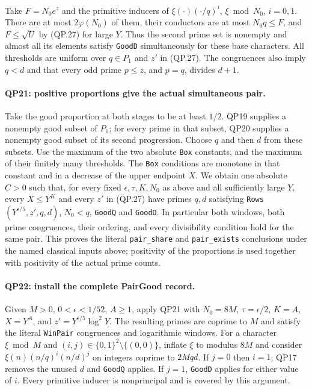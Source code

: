 Take $F=N_0e^z$ and the primitive inducers of
$\xi(\cdot)(\cdot/q)^i$, $\xi\bmod N_0$, $i=0,1$.
There are at most $2\varphi(N_0)$ of them, their conductors are at most
$N_0q\le F$, and $F\le\sqrt U$ by (QP.27) for large $Y$.
Thus the second prime set is nonempty and almost all its elements
satisfy \texttt{GoodD} simultaneously for these base characters.
All thresholds are uniform over $q\in P_1$ and $z'$ in (QP.27).
The congruences also imply $q<d$ and that every odd prime $p\le z$,
and $p=q$, divides $d+1$.

\paragraph{QP21: positive proportions give the actual simultaneous pair.}
Take the good proportion at both stages to be at least $1/2$.
QP19 supplies a nonempty good subset of $P_1$; for every prime in that
subset, QP20 supplies a nonempty good subset of its second progression.
Choose $q$ and then $d$ from these subsets.  Use the maximum of the two
absolute \texttt{Box} constants, and the maximum of their finitely many
thresholds.  The \texttt{Box} conditions are monotone in that constant
and in a decrease of the upper endpoint $X$.
We obtain one absolute $C>0$ such that, for every fixed
$\epsilon,\tau,K,N_0$ as above and all sufficiently large $Y$, every
$X\le Y^K$ and every $z'$ in (QP.27) have primes $q,d$ satisfying
\texttt{Rows}$(Y^{\epsilon/5},z',q,d)$, $N_0<q$,
\texttt{GoodQ} and \texttt{GoodD}.  In particular both windows,
both prime congruences, their ordering, and every divisibility
condition hold for the same pair.
This proves the literal \texttt{pair\_share} and \texttt{pair\_exists}
conclusions under the named classical inputs above; positivity of the
proportions is used together with positivity of the actual prime counts.

\paragraph{QP22: install the complete PairGood record.}
Given $M>0$, $0<\epsilon<1/52$, $A\ge1$, apply QP21 with
$N_0=8M$, $\tau=\epsilon/2$, $K=A$, $X=Y^A$, and
$z'=Y^{\epsilon/5}\log^2Y$.
The resulting primes are coprime to $M$ and satisfy the literal
\texttt{WinPair} congruences and logarithmic windows.
For a character $\xi\bmod M$ and $(i,j)\in\{0,1\}^2\setminus\{(0,0)\}$,
inflate $\xi$ to modulus $8M$ and consider
$\xi(n)(n/q)^i(n/d)^j$ on integers coprime to $2Mqd$.
If $j=0$ then $i=1$; QP17 removes the unused $d$ and \texttt{GoodQ}
applies.  If $j=1$, \texttt{GoodD} applies for either value of $i$.
Every primitive inducer is nonprincipal and is covered by this argument.

